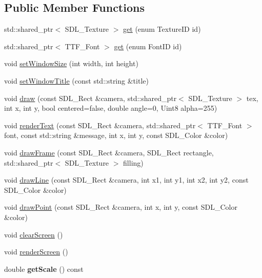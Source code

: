 \subsection*{Public Member Functions}
\begin{DoxyCompactItemize}
\item 
std\+::shared\+\_\+ptr$<$ S\+D\+L\+\_\+\+Texture $>$ \hyperlink{class_graphics_aa4ea206d2d0838ecd873638be99205d4}{get} (enum Texture\+I\+D id)
\item 
std\+::shared\+\_\+ptr$<$ T\+T\+F\+\_\+\+Font $>$ \hyperlink{class_graphics_a9f24cc7b326adf611a565fe641e28dba}{get} (enum Font\+I\+D id)
\item 
void \hyperlink{class_graphics_a9fcb953235531e09e1d7bc95290a4c31}{set\+Window\+Size} (int width, int height)
\item 
void \hyperlink{class_graphics_a86b6e3374661fc74f4cfc98219c6ccad}{set\+Window\+Title} (const std\+::string \&title)
\item 
void \hyperlink{class_graphics_a928aee39e2d10dfc6ff1dbb4c5b8a743}{draw} (const S\+D\+L\+\_\+\+Rect \&camera, std\+::shared\+\_\+ptr$<$ S\+D\+L\+\_\+\+Texture $>$ tex, int x, int y, bool centered=false, double angle=0, Uint8 alpha=255)
\item 
void \hyperlink{class_graphics_a4e502f4b37a289e4964cfa3dc11d2b21}{render\+Text} (const S\+D\+L\+\_\+\+Rect \&camera, std\+::shared\+\_\+ptr$<$ T\+T\+F\+\_\+\+Font $>$ font, const std\+::string \&message, int x, int y, const S\+D\+L\+\_\+\+Color \&color)
\item 
void \hyperlink{class_graphics_ad483c1cc7c81f7a30ec88985b0c009f4}{draw\+Frame} (const S\+D\+L\+\_\+\+Rect \&camera, S\+D\+L\+\_\+\+Rect rectangle, std\+::shared\+\_\+ptr$<$ S\+D\+L\+\_\+\+Texture $>$ filling)
\item 
void \hyperlink{class_graphics_a7ba9ba262d144f0fb36a9dacfd2f62ee}{draw\+Line} (const S\+D\+L\+\_\+\+Rect \&camera, int x1, int y1, int x2, int y2, const S\+D\+L\+\_\+\+Color \&color)
\item 
void \hyperlink{class_graphics_a7c3828e7e128eebad5350eed95c33b7e}{draw\+Point} (const S\+D\+L\+\_\+\+Rect \&camera, int x, int y, const S\+D\+L\+\_\+\+Color \&color)
\item 
void \hyperlink{class_graphics_a68beb512b0697952ebafce249c86dbd3}{clear\+Screen} ()
\item 
void \hyperlink{class_graphics_a8adfc8042fbf4816a23e79ae8bd69ac0}{render\+Screen} ()
\item 
\hypertarget{class_graphics_aae5b16d2e6a3c6c65007fc9d7169b26a}{}double {\bfseries get\+Scale} () const \label{class_graphics_aae5b16d2e6a3c6c65007fc9d7169b26a}


\end{DoxyCompactItemize}
